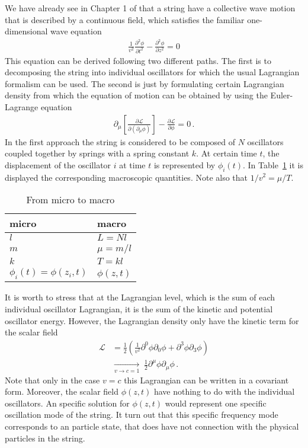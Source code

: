 We have already see in Chapter 1 of \cite{lsm} that a string have a collective wave motion that is described by a continuous field, which satisfies the familiar one-dimensional wave equation
\begin{align}
\label{eq:2}
  \frac{1}{v^2}\frac{\partial^2\phi}{\partial t^2}-\frac{\partial^2\phi}{\partial z^2}=0
\end{align}
This equation can be derived following two different paths. The first is to decomposing the string into individual oscillators for which the usual Lagrangian formalism can be used. The second is just by formulating certain Lagrangian density from which the equation of motion can be obtained  by using the Euler-Lagrange equation
\begin{align}
  \partial_\mu\left[\frac{\partial\mathcal{L}}{\partial(\partial_\mu\phi)}\right]-\frac{\partial\mathcal{L}}{\partial\phi}=0\,.
\end{align}
In the first approach the string is considered to be composed of $N$ oscillators coupled together  by springs with a spring constant $k$. At certain time $t$, the displacement of the oscillator $i$ at time $t$ is represented by $\phi_i(t)$. In Table~\ref{tab:1} it is displayed the corresponding macroscopic quantities. Note also that $1/v^2=\mu/T$.
\begin{table}[htp!]
  \centering
  \begin{tabular}{l|l}
    micro & macro \\\hline{}
    $l$ & $L=N l$\\
    $m$ & $\mu=m/l$ \\
    $k$ & $T=k l$\\
    $\phi_i(t)=\phi(z_i,t)$ &  $\phi(z,t)$\\
  \end{tabular}
  \caption{From micro to macro}
\label{tab:1}
\end{table}
It is worth to stress that at the Lagrangian level, which is the sum of each individual oscillator Lagrangian, it is the sum of the kinetic and potential oscillator energy. However, the Lagrangian density only have the kinetic term for the scalar field
\begin{align}
  \mathcal{L}&=\frac{1}{2}\left(\frac{1}{v^2}\partial^0\phi\partial_0\phi+\partial^3\phi\partial_3\phi\right)\nonumber\\
  &\underset{v\to c=1}{\longrightarrow}\;\tfrac{1}{2}\partial^\mu\phi\partial_\mu\phi\,.
\end{align}
Note that only in the case $v=c$ this Lagrangian can be written in a covariant form. Moreover, the scalar field $\phi(z,t)$ have nothing to do with the individual oscillators. An specific solution for $\phi(z,t)$ would represent one specific oscillation mode of the string. It turn out that  this specific frequency mode corresponds to an particle state, that does have not connection with the physical particles in the string. 

